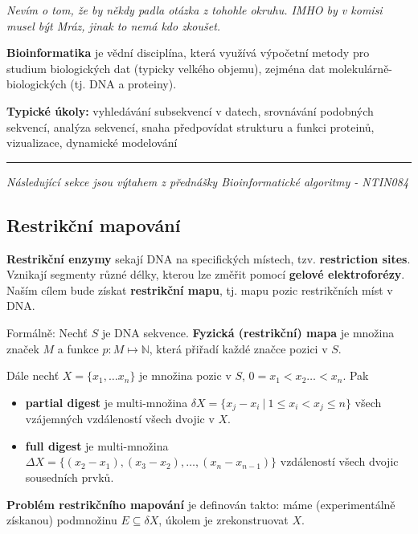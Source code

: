 \documentclass[11pt]{report} %
\newcommand{\N}{\mathbb{N}}
\numberwithin{equation}{section}
\begin{document}
\textit{Nevím o tom, že by někdy padla otázka z tohohle okruhu. IMHO by v komisi musel být Mráz, jinak to nemá kdo zkoušet.}

\textbf{Bioinformatika} je vědní disciplína, která využívá výpočetní metody pro studium biologických dat (typicky velkého objemu), zejména dat molekulárně-biologických (tj. DNA a proteiny).

\textbf{Typické úkoly:} vyhledávání subsekvencí v datech, srovnávání podobných sekvencí, analýza sekvencí, snaha předpovídat strukturu a funkci proteinů, vizualizace, dynamické modelování 

\bigskip
\hrule
\medskip
\textit{Následující sekce jsou výtahem z přednášky Bioinformatické algoritmy - NTIN084}

\subsection{Restrikční mapování}
\textbf{Restrikční enzymy} sekají DNA na specifických místech, tzv. \textbf{restriction sites}. Vznikají segmenty různé délky, kterou lze změřit pomocí \textbf{gelové elektroforézy}. Naším cílem bude získat \textbf{restrikční mapu}, tj. mapu pozic restrikčních míst v DNA. 

Formálně: Nechť $S$ je DNA sekvence. \textbf{Fyzická (restrikční) mapa} je množina značek $M$ a funkce $p: M \mapsto \N$, která přiřadí každé značce pozici v $S$. 

Dále nechť $X = \{x_1,\dots x_n\}$ je množina pozic v $S$, $0 = x_1 < x_2 \dots < x_n$. Pak
\begin{itemize}
	\item \textbf{partial digest} je multi-množina $\delta X = \{x_j - x_i\ |\ 1 \leq x_i < x_j \leq n\}$ všech vzájemných vzdáleností všech dvojic v $X$.
	
	\item \textbf{full digest} je multi-množina $\Delta X = \{(x_2 -x_1), (x_3 - x_2), \dots, (x_n - x_{n-1}) \}$ vzdáleností všech dvojic sousedních prvků.
\end{itemize}

\textbf{Problém restrikčního mapování} je definován takto: máme (experimentálně získanou) podmnožinu $E \subseteq \delta X$, úkolem je zrekonstruovat $X$.
\end{document}
